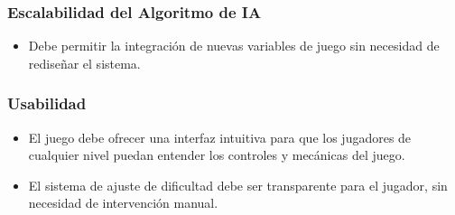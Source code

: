 \subsubsection{Escalabilidad del Algoritmo de IA}
\begin{itemize}
    \item Debe permitir la integración de nuevas variables de juego sin necesidad de rediseñar el sistema.
\end{itemize}

\subsubsection{Usabilidad}
\begin{itemize}
    \item El juego debe ofrecer una interfaz intuitiva para que los jugadores de cualquier nivel puedan entender los controles y mecánicas del juego.
    \item El sistema de ajuste de dificultad debe ser transparente para el jugador, sin necesidad de intervención manual.
\end{itemize}
